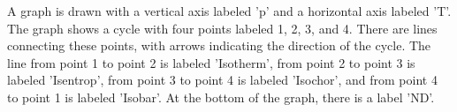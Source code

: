 A graph is drawn with a vertical axis labeled 'p' and a horizontal axis labeled 'T'. The graph shows a cycle with four points labeled 1, 2, 3, and 4. There are lines connecting these points, with arrows indicating the direction of the cycle. The line from point 1 to point 2 is labeled 'Isotherm', from point 2 to point 3 is labeled 'Isentrop', from point 3 to point 4 is labeled 'Isochor', and from point 4 to point 1 is labeled 'Isobar'. At the bottom of the graph, there is a label 'ND'.
